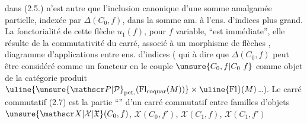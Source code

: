 dans (2.5.) n'est autre que l'inclusion canonique d'une somme amalgamée partielle, indexée par $\Delta(C_0,f)$, dans la somme am.  à l'ens. d'indices plus grand. La fonctorialité de cette flèche $u_1(f)$, pour $f$ variable, ``est immédiate'', elle résulte de la commutativité du carré, associé à un  morphisme  de flèches
,   diagramme d'applications entre ens. d'indices
(   qui  à dire que $\Delta(C_0,f)$ peut être considéré comme un foncteur en le couple $\unsure{C_0,f|C_0\ f}$  comme objet de la catégorie produit $\uline{\unsure{\mathscr P|\mathcal P}_{\mathrm{pet.}}(\mathrm{Fl}_{\mathrm{coquar}}(M))}\times\uline{\mathrm{Fl}}(M)$\ldots). Le carré commutatif (2.7) est la partie ``'' d'un carré commutatif entre familles d'objets $\unsure{\mathscr X|\mathcal X|\mathfrak X}(C_0,f)$, $\mathscr X(C_0,f')$, $\mathscr X(C_1,f)$, $\mathscr X(C_1,f')$
